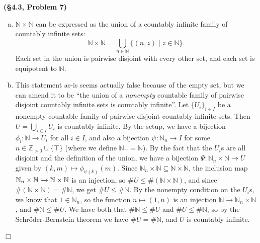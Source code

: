 \documentclass[12pt]{article}
\theoremstyle{definition}
\newenvironment{Solution}{\noindent {\sc Solution.}}{$\Box$ \vspace{2 ex}}
\begin{document}
\begin{Solution}
{\bf (\S4.3, Problem 7)}\\
\begin{enumerate}[(a)]
\item $\mathbb N \times \mathbb N$ can be expressed as the union of a countably infinite family of countably infinite sets: \[ \mathbb N \times \mathbb N = \bigcup_{n \in \mathbb N} \{(n, z)\mid z \in \mathbb N\}.\]
Each set in the union is pairwise disjoint with every other set, and each set is equipotent to $\mathbb N$.
\item This statement as-is seems actually false because of the empty set, but we can amend it to be ``the union of a \textit{nonempty} countable family of pairwise disjoint countably infinite sets is countably infinite''. Let $\{U_i\}_{i \in I}$ be a nonempty countable family of pairwise disjoint countably infinite sets. Then $U = \bigcup_{i \in I} U_i$ is countably infinite. By the setup, we have a bijection $\phi_i : \mathbb N \to U_i$ for all $i \in I$, and also a bijection $\psi : \mathbb N_n \to I$ for some $n \in \mathbb Z_{> 0}\cup \{\top\}$ (where we define $\mathbb N_\top = \mathbb N$). By the fact that the $U_i$s are all disjoint and the definition of the union, we have a bijection $\Psi : \mathbb N_n \times \mathbb N \to U$ given by $(k, m) \mapsto \phi_{\psi(k)}(m)$. Since $\mathbb N_n \times \mathbb N \subseteq \mathbb N \times \mathbb N$, the inclusion map $\mathbb N_n \times \mathbb N \xhookrightarrow{} \mathbb N \times \mathbb N$ is an injection, so $\# U \le \# (\mathbb N \times \mathbb N)$, and since $\#(\mathbb N \times \mathbb N) = \# \mathbb N$, we get $\# U \le \# \mathbb N$. By the nonempty condition on the $U_i$s, we know that $1 \in \mathbb N_n$, so the function $n\mapsto (1,n)$ is an injection $\mathbb N \to \mathbb N_n \times \mathbb N$, and $\# \mathbb N \le \# U$. We have both that $\# \mathbb N \le \#U$ and $\# U \le \# \mathbb N$, so by the Schr\"oder-Bernstein theorem we have $\# U = \# \mathbb N$, and $U$ is countably infinite.
\end{enumerate}
\end{Solution}
\end{document}

